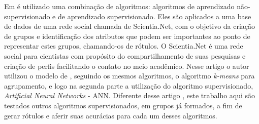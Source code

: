 Em \cite{DeLima2015} é utilizado uma combinação de algoritmos: algoritmos de aprendizado não-supervisionado e de aprendizado supervisionado. Eles são aplicados a uma base de dados de uma rede social chamada de Scientia.Net, com o objetivo da criação de grupos e identificação dos atributos que podem ser importantes ao ponto de representar estes  grupos, chamando-os de rótulos. O Scientia.Net é uma rede social para cientistas com propósito do compartilhamento de suas pesquisas e criação de perfis facilitando o contato no meio acadêmico. Nesse artigo o autor utilizou o modelo de \cite{Lopes2016}, seguindo os mesmos algoritmos, o algoritmo \textit{k-means} para agrupamento, e logo na segunda parte a utilização  do algoritmo supervisionado, \textit{Artificial Neural Networks} - ANN. Diferente desse artigo \cite{DeLima2015}, este trabalho aqui são testados outros algoritmos supervisionados, em grupos já formados, a fim de gerar rótulos e aferir suas acurácias para cada um desses algoritmos.
% 
% 
% 
% 


